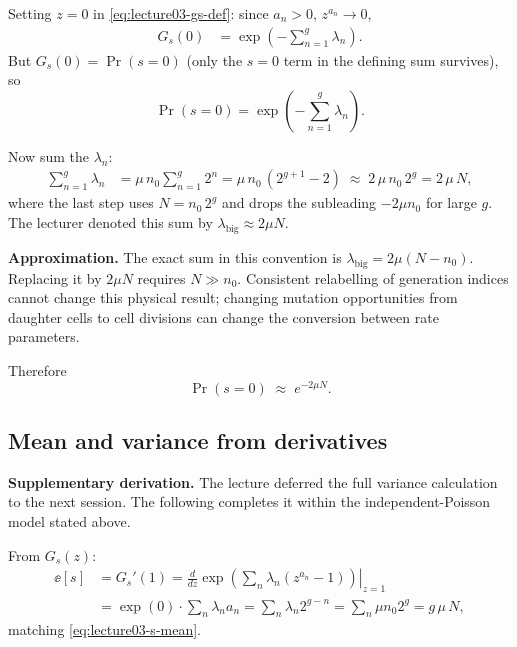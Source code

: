 Setting $z=0$ in \eqref{eq:lecture03-gs-def}: since $a_n>0$, $z^{a_n}\to0$,
\begin{align}\label{eq:lecture03-gs-zero}
G_s(0)
&= \exp\!\left(-\sum_{n=1}^{g}\lambda_n\right).
\end{align}
But $G_s(0) = \Pr(s=0)$ (only the $s=0$ term in the defining sum survives), so
\begin{equation}\label{eq:lecture03-p-zero}
\Pr(s=0) = \exp\!\left(-\sum_{n=1}^{g}\lambda_n\right).
\end{equation}

Now sum the $\lambda_n$:
\begin{align}\label{eq:lecture03-lambda-sum}
\sum_{n=1}^{g}\lambda_n
&= \mu\,n_0\sum_{n=1}^{g}2^{n}
= \mu\,n_0\,(2^{g+1}-2)
\;\approx\; 2\,\mu\,n_0\,2^{g}
= 2\,\mu\,N ,
\end{align}
where the last step uses $N=n_0\,2^{g}$ and drops the subleading $-2\mu n_0$ for large $g$. The lecturer denoted this sum by $\lambda_{\mathrm{big}}\approx 2\mu N$.

\begin{remark}\label{rem:lecture03-lambda-big}
\textbf{Approximation.}
The exact sum in this convention is $\lambda_{\mathrm{big}}=2\mu(N-n_0)$. Replacing it by $2\mu N$ requires $N\gg n_0$. Consistent relabelling of generation indices cannot change this physical result; changing mutation opportunities from daughter cells to cell divisions can change the conversion between rate parameters.
\end{remark}

Therefore
\begin{equation}\label{eq:lecture03-p-zero-final}
\Pr(s=0) \;\approx\; e^{-2\mu N}.
\end{equation}

\subsection{Mean and variance from derivatives}\label{sec:lecture03-s-moments}
\textbf{Supplementary derivation.} The lecture deferred the full variance calculation to the next session. The following completes it within the independent-Poisson model stated above.

From $G_s(z)$:
\begin{align}
\ee[s] &= G_s'(1)
= \left.\frac{d}{dz}\exp\!\left(\sum_n\lambda_n(z^{a_n}-1)\right)\right|_{z=1} \\
&= \exp(0)\cdot\sum_n\lambda_n a_n
= \sum_n \lambda_n 2^{g-n}
= \sum_n \mu n_0 2^{g}
= g\,\mu\,N,
\end{align}
matching \eqref{eq:lecture03-s-mean}.

